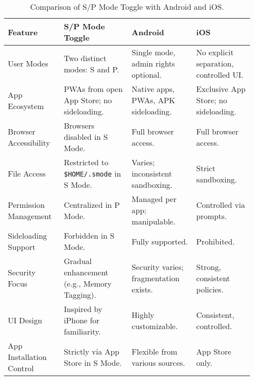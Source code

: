 
\begin{table*}[h!]
\centering
\begin{tabular}{p{3.5cm}p{3.5cm}p{3.5cm}p{3.5cm}}
\hline
\textbf{Feature} & \textbf{S/P Mode Toggle} & \textbf{Android} & \textbf{iOS} \\
\hline\hline
User Modes & Two distinct modes: S and P. & Single mode, admin rights optional. & No explicit separation, controlled UI. \\
\hline
App Ecosystem & PWAs from open App Store; no sideloading. & Native apps, PWAs, APK sideloading. & Exclusive App Store; no sideloading. \\
\hline
Browser Accessibility & Browsers disabled in S Mode. & Full browser access. & Full browser access. \\
\hline
File Access & Restricted to \texttt{\$HOME/.smode} in S Mode. & Varies; inconsistent sandboxing. & Strict sandboxing. \\
\hline
Permission Management & Centralized in P Mode. & Managed per app; manipulable. & Controlled via prompts. \\
\hline
Sideloading Support & Forbidden in S Mode. & Fully supported. & Prohibited. \\
\hline
Security Focus & Gradual enhancement (e.g., Memory Tagging). & Security varies; fragmentation exists. & Strong, consistent policies. \\
\hline
UI Design & Inspired by iPhone for familiarity. & Highly customizable. & Consistent, controlled. \\
\hline
App Installation Control & Strictly via App Store in S Mode. & Flexible from various sources. & App Store only. \\
\hline
\end{tabular}
\caption{Comparison of S/P Mode Toggle with Android and iOS.}
\label{tab:comparison}
\end{table*}

